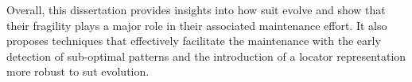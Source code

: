 Overall, this dissertation provides insights into how \gls{suit} evolve and show that their fragility plays a major role in their associated maintenance effort. It also proposes techniques that effectively facilitate the maintenance with the early detection of sub-optimal patterns and the introduction of a locator representation more robust to \gls{sut} evolution.
